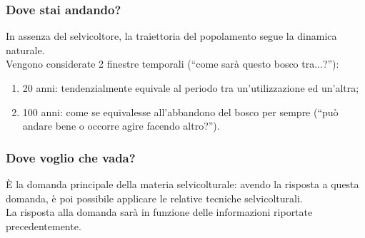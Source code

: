 \subsubsection{Dove stai andando?}
In assenza del selvicoltore, la traiettoria del popolamento segue la dinamica naturale.\\
Vengono considerate 2 finestre temporali (``come sarà questo bosco tra...?''):
\begin{enumerate}[nosep]
    \item 20 anni: tendenzialmente equivale al periodo tra un'utilizzazione ed un'altra;
    \item 100 anni: come se equivalesse all'abbandono del bosco per sempre (``può andare bene o occorre agire facendo altro?'').
\end{enumerate}
\subsubsection{Dove voglio che vada?}
È la domanda principale della materia selvicolturale: avendo la risposta a questa domanda, è poi possibile applicare le relative tecniche selvicolturali.\\
La risposta alla domanda sarà in funzione delle informazioni riportate precedentemente.